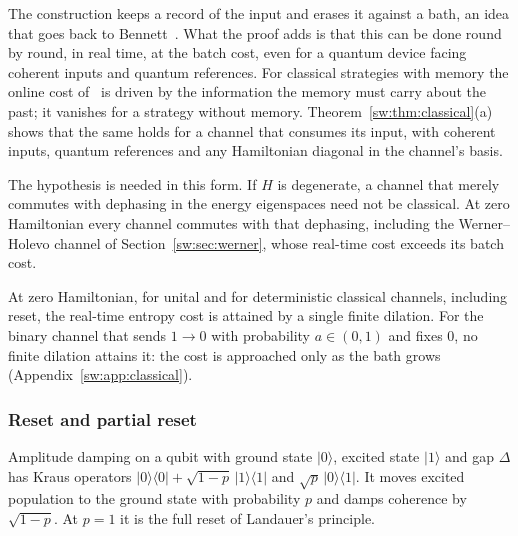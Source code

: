 The construction keeps a record of the input and erases it against a bath, an idea that goes back to Bennett~\cite{Bennett73}. What the proof adds is that this can be done round by round, in real time, at the batch cost, even for a quantum device facing coherent inputs and quantum references. For classical strategies with memory the online cost of~\cite{Thompson25} is driven by the information the memory must carry about the past; it vanishes for a strategy without memory. Theorem~\ref{sw:thm:classical}(a) shows that the same holds for a channel that consumes its input, with coherent inputs, quantum references and any Hamiltonian diagonal in the channel's basis.

The hypothesis is needed in this form. If $H$ is degenerate, a channel that merely commutes with dephasing in the energy eigenspaces need not be classical. At zero Hamiltonian every channel commutes with that dephasing, including the Werner--Holevo channel of Section~\ref{sw:sec:werner}, whose real-time cost exceeds its batch cost.

\begin{remark}\label{sw:rem:attained}
At zero Hamiltonian, for unital and for deterministic classical channels, including reset, the real-time entropy cost is attained by a single finite dilation. For the binary channel that sends $1\to0$ with probability $a\in(0,1)$ and fixes $0$, no finite dilation attains it: the cost is approached only as the bath grows (Appendix~\ref{sw:app:classical}).
\end{remark}

\subsubsection{Reset and partial reset}

Amplitude damping on a qubit with ground state $|0\rangle$, excited state $|1\rangle$ and gap $\Delta$ has Kraus operators $|0\rangle\langle0|+\sqrt{1-p}\,|1\rangle\langle1|$ and $\sqrt p\,|0\rangle\langle1|$. It moves excited population to the ground state with probability $p$ and damps coherence by $\sqrt{1-p}$. At $p=1$ it is the full reset of Landauer's principle.

